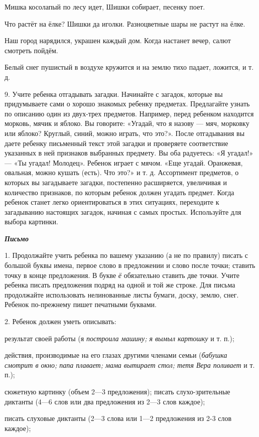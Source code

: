 \documentclass{book}
\renewcommand{\emph}[1]{\textit{#1}}
\begin{document}
Мишка косолапый по лесу идет, Шишки собирает, песенку поет.

Что растёт на ёлке? Шишки да иголки. Разноцветные шары не растут на
ёлке.

Наш город нарядился, украшен каждый дом. Когда настанет вечер, салют
смотреть пойдём.

Белый снег пушистый в воздухе кружится и на землю тихо падает, ложится,
и т. д.

9. Учите ребенка отгадывать загадки. Начинайте с загадок, которые вы
придумываете сами о хорошо знакомых ребенку предметах. Предлагайте
узнать по описанию один из двух-трех предметов. Например, перед ребенком
находится морковь, мячик и яблоко. Вы говорите: «Угадай, что я назову
--- мяч, морковку или яблоко? Круглый, синий, можно играть, что это?».
После отгадывания вы даете ребенку письменный текст этой загадки и
проверяете соответствие указанных в ней признаков выбранных предмету. Вы
оба радуетесь: «Я угадал!» --- «Ты угадал! Молодец». Ребенок играет с
мячом. «Еще угадай. Оранжевая, овальная, можно кушать (есть). Что это?»
и т. д. Ассортимент предметов, о которых вы загадываете загадки,
постепенно расширяется, увеличивая и количество признаков, по которым
ребенок должен угадать предмет. Когда ребенок станет легко
ориентироваться в этих ситуациях, переходите к загадыванию настоящих
загадок, начиная с самых простых. Используйте для выбора картинки.

\emph{\textbf{Письмо}}

1. Продолжайте учить ребенка по вашему указанию (а не по правилу) писать
с большой буквы имена, первое слово в предложении и слово после точки;
ставить точку в конце предложения. В букве \emph{ё} обязательно ставить
две точки. Учите ребенка писать предложения подряд на одной и той же
строке. Для письма продолжайте использовать нелинованные листы бумаги,
доску, землю, снег. Ребенок по-прежнему пишет печатными буквами.

2. Ребенок должен уметь описывать:

результат своей работы (я \emph{построила машину; я вымыл картошку} и т.
п.);

действия, производимые на его глазах другими членами семьи
(\emph{бабушка смотрит в окно; папа плавает; мама вытирает стол; тетя
Вера поливает} и т. п.);

сюжетную картинку (объем 2---3 предложения); писать слухо-зрительные
диктанты (4---6 слов или два предложения из 2---3 слов каждое);

писать слуховые диктанты (2---3 слова или 1---2 предложения из 2-3 слов
каждое);
\end{document}
